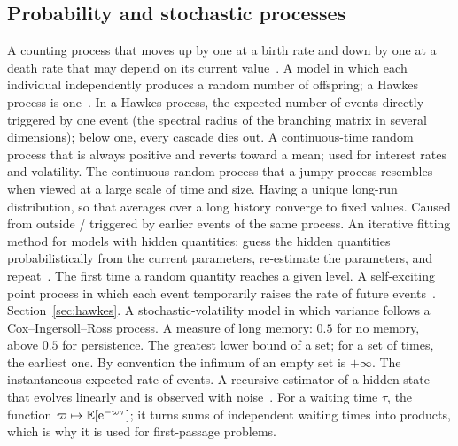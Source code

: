 \subsection{Probability and stochastic processes}
\begin{description}[leftmargin=1.2em,style=sameline,itemsep=1pt,font=\normalfont\bfseries]
 A counting process that moves up by one at a birth rate and down by one at a death rate that may depend on its current value~\citep{cst2010}.
 A model in which each individual independently produces a random number of offspring; a Hawkes process is one~\citep{hawkesoakes1974}.
 In a Hawkes process, the expected number of events directly triggered by one
  event (the spectral radius of the branching matrix in several dimensions); below one, every cascade dies out.
 A continuous-time random process that is always positive and
  reverts toward a mean; used for interest rates and volatility.
 The continuous random process that a jumpy process resembles when viewed at a
  large scale of time and size.
 Having a unique long-run distribution, so that averages over a long history converge to fixed values.
 Caused from outside / triggered by earlier events of the same process.
 An iterative fitting method for models with hidden quantities: guess the hidden quantities probabilistically from the current parameters, re-estimate the parameters, and repeat~\citep{veen2008em}.
 The first time a random quantity reaches a given level.
 A self-exciting point process in which each event temporarily raises the rate
  of future events~\citep{hawkes1971,bacry2015}. Section~\ref{sec:hawkes}.
 A stochastic-volatility model in which variance follows a Cox--Ingersoll--Ross process.
 A measure of long memory: $0.5$ for no memory, above $0.5$ for persistence.
 The greatest lower bound of a set; for a set of times, the earliest one. By convention the infimum of an empty set is $+\infty$.
 The instantaneous expected rate of events.
 A recursive estimator of a hidden state that evolves linearly and is observed with noise~\citep{kalman1960}.
 For a waiting time $\tau$, the function $\varpi \mapsto \mathbb{E}[\mathrm{e}^{-\varpi\tau}]$; it turns sums of independent waiting times into products, which is why it is used for first-passage problems.

\end{description}
